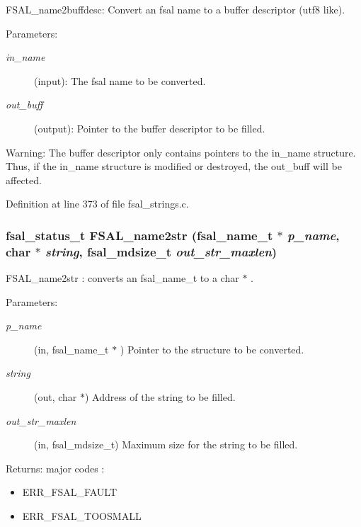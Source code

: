 FSAL\_\-name2buffdesc: Convert an fsal name to a buffer descriptor (utf8 like).

\begin{Desc}
\item[Parameters:]
\begin{description}
\item[{\em in\_\-name}](input): The fsal name to be converted. \item[{\em out\_\-buff}](output): Pointer to the buffer descriptor to be filled.\end{description}
\end{Desc}
\begin{Desc}
\item[Warning:]The buffer descriptor only contains pointers to the in\_\-name structure. Thus, if the in\_\-name structure is modified or destroyed, the out\_\-buff will be affected. \end{Desc}


Definition at line 373 of file fsal\_\-strings.c.
\subsubsection[{FSAL\_\-name2str}]{\setlength{\rightskip}{0pt plus 5cm}fsal\_\-status\_\-t FSAL\_\-name2str (fsal\_\-name\_\-t $\ast$ {\em p\_\-name}, \/  char $\ast$ {\em string}, \/  fsal\_\-mdsize\_\-t {\em out\_\-str\_\-maxlen})}\label{group__FSALNameFunctions_gbe3cc709e0609c51e87cdc266fed9b31}


FSAL\_\-name2str : converts an fsal\_\-name\_\-t to a char $\ast$ .

\begin{Desc}
\item[Parameters:]
\begin{description}
\item[{\em p\_\-name}](in, fsal\_\-name\_\-t $\ast$ ) Pointer to the structure to be converted. \item[{\em string}](out, char $\ast$) Address of the string to be filled. \item[{\em out\_\-str\_\-maxlen}](in, fsal\_\-mdsize\_\-t) Maximum size for the string to be filled.\end{description}
\end{Desc}
\begin{Desc}
\item[Returns:]major codes :\begin{itemize}
\item ERR\_\-FSAL\_\-FAULT\item ERR\_\-FSAL\_\-TOOSMALL \end{itemize}
\end{Desc}


